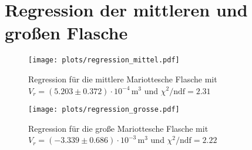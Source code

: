 \documentclass[a4paper, 12pt]{scrartcl}
\begin{document}
\appendix
\section{Regression der mittleren und großen Flasche}\label{app:reg}
\begin{figure}[H]
\centering
\texttt{[image: plots/regression\_mittel.pdf]}
\caption{Regression für die mittlere Mariottesche Flasche mit $V_r = (5.203 \pm 0.372)\cdot 10^{-4}\,\text{m}^3$ und $\chi^2/\text{ndf} = 2.31$}
\end{figure}
\begin{figure}[H]
\centering
\texttt{[image: plots/regression\_grosse.pdf]}
\caption{Regression für die große Mariottesche Flasche mit $V_r = (-3.339 \pm 0.686)\cdot 10^{-3}\,\text{m}^3$ und $\chi^2/\text{ndf} = 2.22$}
\end{figure}
\end{document}
